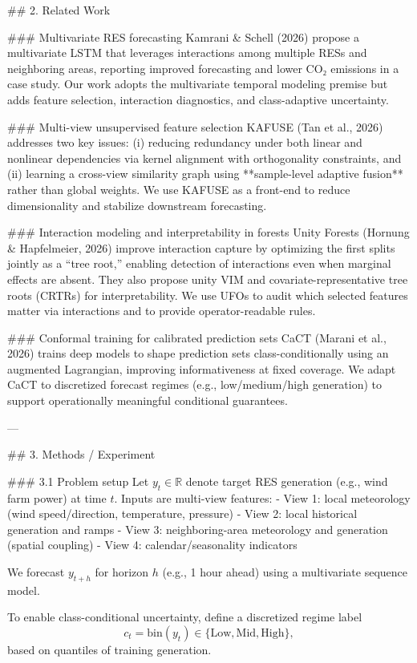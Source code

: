 ## 2. Related Work  

### Multivariate RES forecasting  
Kamrani & Schell (2026) propose a multivariate LSTM that leverages interactions among multiple RESs and neighboring areas, reporting improved forecasting and lower CO₂ emissions in a case study. Our work adopts the multivariate temporal modeling premise but adds feature selection, interaction diagnostics, and class-adaptive uncertainty.

### Multi-view unsupervised feature selection  
KAFUSE (Tan et al., 2026) addresses two key issues: (i) reducing redundancy under both linear and nonlinear dependencies via kernel alignment with orthogonality constraints, and (ii) learning a cross-view similarity graph using **sample-level adaptive fusion** rather than global weights. We use KAFUSE as a front-end to reduce dimensionality and stabilize downstream forecasting.

### Interaction modeling and interpretability in forests  
Unity Forests (Hornung & Hapfelmeier, 2026) improve interaction capture by optimizing the first splits jointly as a “tree root,” enabling detection of interactions even when marginal effects are absent. They also propose unity VIM and covariate-representative tree roots (CRTRs) for interpretability. We use UFOs to audit which selected features matter via interactions and to provide operator-readable rules.

### Conformal training for calibrated prediction sets  
CaCT (Marani et al., 2026) trains deep models to shape prediction sets class-conditionally using an augmented Lagrangian, improving informativeness at fixed coverage. We adapt CaCT to discretized forecast regimes (e.g., low/medium/high generation) to support operationally meaningful conditional guarantees.

---

## 3. Methods / Experiment  

### 3.1 Problem setup  
Let \(y_t \in \mathbb{R}\) denote target RES generation (e.g., wind farm power) at time \(t\). Inputs are multi-view features:
- View 1: local meteorology (wind speed/direction, temperature, pressure)  
- View 2: local historical generation and ramps  
- View 3: neighboring-area meteorology and generation (spatial coupling)  
- View 4: calendar/seasonality indicators  

We forecast \(y_{t+h}\) for horizon \(h\) (e.g., 1 hour ahead) using a multivariate sequence model.

To enable class-conditional uncertainty, define a discretized regime label  
\[
c_t = \text{bin}(y_t) \in \{\text{Low}, \text{Mid}, \text{High}\},
\]
based on quantiles of training generation.

